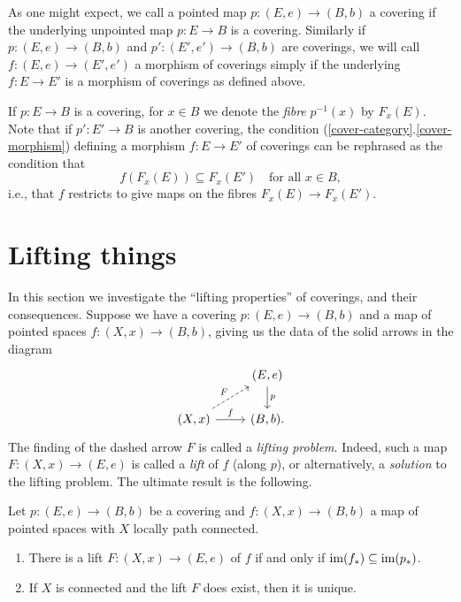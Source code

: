 \begin{nothing}
  As one might expect, we call a pointed map $p : (E,e) \to (B,b)$ a
  covering if the underlying unpointed map $p : E \to B$ is a
  covering. Similarly if $p : (E,e) \to (B,b)$ and $p' : (E',e') \to
  (B,b)$ are coverings, we will call $f : (E,e) \to (E',e')$ a
  morphism of coverings simply if the underlying $f : E \to E'$ is a
  morphism of coverings as defined above.
\end{nothing}

\begin{definition}
  \label{fibre}
  If $p : E \to B$ is a covering, for $x \in B$ we denote the
  \emph{fibre} $p^{-1}(x)$ by $F_x(E)$. Note that if $p' : E' \to B$
  is another covering, the condition
  (\ref{cover-category}.\ref{cover-morphism}) defining a morphism $f :
  E \to E'$ of coverings can be rephrased as the condition that
  \[
  f(F_x(E)) \subseteq F_x(E') \quad\text{for all } x \in B,
  \]
  i.e., that $f$ restricts to give maps on the fibres $F_x(E) \to
  F_x(E')$.
\end{definition}


\section{Lifting things}

\begin{nothing}
  In this section we investigate the ``lifting properties'' of
  coverings, and their consequences. Suppose we have a covering $p :
  (E,e) \to (B,b)$ and a map of pointed spaces $f : (X,x) \to (B,b)$,
  giving us the data of the solid arrows in the diagram
  \begin{equation}
    \label{lifting-problem}
    \begin{tikzcd}
      \ & (E,e) \dar{p} \\ (X,x) \rar{f} \ar[dashed]{ur}{F} & (B,b).
    \end{tikzcd}
  \end{equation}
  The finding of the dashed arrow $F$ is called a \emph{lifting
    problem}. Indeed, such a map $F : (X,x) \to (E,e)$ is called a
  \emph{lift} of $f$ (along $p$), or alternatively, a \emph{solution}
  to the lifting problem. The ultimate result is the following.
\end{nothing}

\begin{proposition}
  \label{general-lifting}
  Let $p : (E,e) \to (B,b)$ be a covering and $f : (X,x) \to (B,b)$ a
  map of pointed spaces with $X$ locally path connected.
  \begin{enumerate}
  \item There is a lift $F : (X,x) \to (E,e)$ of $f$ if and only if
    $\operatorname{im}(f_*) \subseteq \operatorname{im}(p_*)$.
  \item If $X$ is connected and the lift $F$ does exist, then it is
    unique.
  \end{enumerate}
\end{proposition}

